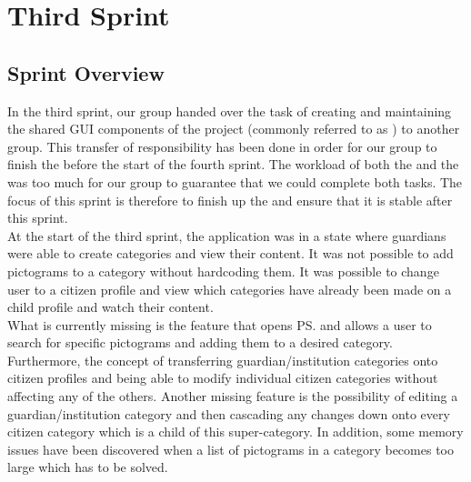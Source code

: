 \part{Third Sprint}
\label{par:third_sprint}

\chapter{Sprint Overview}
In the third sprint, our group handed over the task of creating and maintaining the shared GUI components of the project (commonly referred to as \gc) to another group. This transfer of responsibility has been done in order for our group to finish the \ct before the start of the fourth sprint. The workload of both the \ct and the \gc was too much for our group to guarantee that we could complete both tasks. The focus of this sprint is therefore to finish up the \ct and ensure that it is stable after this sprint.\\

At the start of the third sprint, the application was in a state where guardians were able to create categories and view their content. It was not possible to add pictograms to a category without hardcoding them. It was possible to change user to a citizen profile and view which categories have already been made on a child profile and watch their content. \\

What is currently missing is the feature that opens \ps and allows a user to search for specific pictograms and adding them to a desired category. Furthermore, the concept of transferring guardian/institution categories onto citizen profiles and being able to modify individual citizen categories without affecting any of the others. Another missing feature is the possibility of editing a guardian/institution category and then cascading any changes down onto every citizen category which is a child of this super-category. In addition, some memory issues have been discovered when a list of pictograms in a category becomes too large which has to be solved. 





